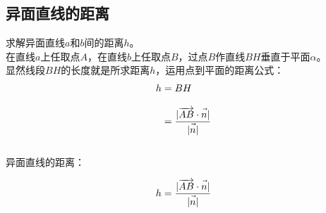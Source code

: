 \documentclass[UTF8]{ctexart}
\let\nvec\vec
\def\vec#1{\nvec{\vphantom b\smash{#1}}}
\begin{document}
\subsection{异面直线的距离}
    求解异面直线$a$和$b$间的距离$h$。\\[5mm]
    在直线$a$上任取点$A$，在直线$b$上任取点$B$，过点$B$作直线$BH$垂直于平面$\alpha$。\\[3mm]
    显然线段$BH$的长度就是所求距离$h$，运用点到平面的距离公式：
    \setcounter{equation}{0}
    \begin{align}
        h
        &=BH\\[3mm]
        &=\frac{|\overrightarrow{AB}\cdot\vec{n}|}{|\vec{n}|}
    \end{align}\\
    异面直线的距离：
    \begin{large}
        \begin{equation*}
            h=\frac{|\overrightarrow{AB}\cdot\vec{n}|}{|\vec{n}|}
        \end{equation*}
    \end{large}\\
\end{document}
